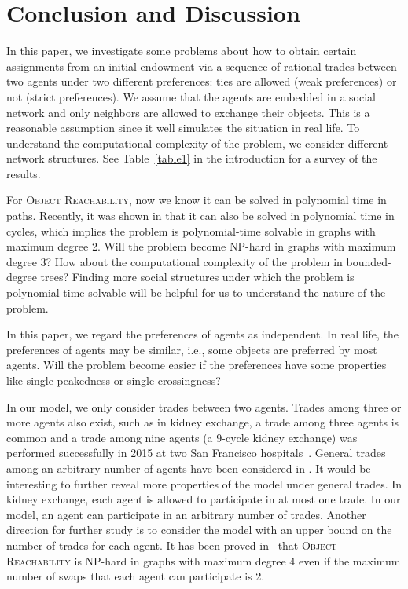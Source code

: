 \section{Conclusion and Discussion}\label{sec-con}
In this paper, we investigate some problems about how to obtain certain assignments from an initial endowment via a sequence of rational trades between two agents under two different preferences: ties are allowed (weak preferences) or not (strict preferences).
We assume that the agents are embedded in a social network and only neighbors are allowed to exchange their objects. This is a reasonable assumption since it well simulates the situation in real life. To understand the computational complexity of the problem, we consider different network structures. See Table~\ref{table1} in the introduction for a survey of the results.

For \textsc{Object Reachability}, now we know it can be solved in polynomial time in paths. Recently, it was shown in \cite{DBLP:journals/corr/abs-1905-04219} that it can also be solved in polynomial time in cycles, which implies the problem is polynomial-time solvable in graphs with maximum degree 2.
Will the problem become NP-hard in graphs with maximum degree 3? How about the computational complexity of the problem in bounded-degree trees?
Finding more social structures under which the problem is polynomial-time solvable will be helpful for us to understand the nature of the problem.

In this paper, we regard the preferences of agents as independent. In real life, the preferences of agents may be similar, i.e., some objects are preferred by most agents.
Will the problem become easier if the preferences have some properties like single peakedness or single crossingness?

In our model, we only consider trades between two agents. Trades among three or more agents also exist, such as in kidney exchange, a trade among three agents is common and
a trade among nine agents (a 9-cycle kidney
exchange) was performed successfully in 2015 at two San Francisco hospitals~\cite{DBLP:journals/jco/Mak-Hau17}.
General trades among an arbitrary number of agents have been considered in \cite{DBLP:conf/atal/DamammeBCM15}. It would be
 interesting to further reveal more properties of the model under general trades.
In kidney exchange, each agent is allowed to participate in at most one trade. In our model, an agent can participate in an arbitrary number of trades.
Another direction for further study is to consider the model with an upper bound on the number of trades for each agent.
It has been proved in~\cite{DBLP:conf/sagt/SaffidineW18} that \textsc{Object Reachability} is NP-hard in graphs with maximum degree 4 even if the maximum number of swaps that each agent can participate is 2.


